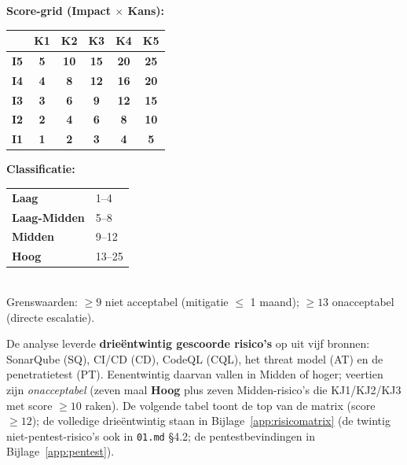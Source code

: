 \documentclass[12pt, a4paper]{report}
\newcommand{\rood}[1]{\textcolor{avansRed}{\textbf{#1}}}
\newcommand{\amber}[1]{\textcolor{ragAmber}{\textbf{#1}}}
\newcommand{\geel}[1]{\textcolor{ragYellow}{\textbf{#1}}}
\newcommand{\groen}[1]{\textcolor{ragGreen}{\textbf{#1}}}
\begin{document}
\begin{minipage}[t]{0.56\textwidth}
\small
\textbf{Score-grid (Impact $\times$ Kans):}\\[0.4em]
\begin{tabular}{@{}c|ccccc@{}}
 & \textbf{K1} & \textbf{K2} & \textbf{K3} & \textbf{K4} & \textbf{K5} \\
\midrule
\textbf{I5} & \geel{5}  & \amber{10} & \rood{15} & \rood{20} & \rood{25} \\
\textbf{I4} & \groen{4} & \geel{8}   & \amber{12}& \rood{16} & \rood{20} \\
\textbf{I3} & \groen{3} & \geel{6}   & \amber{9} & \amber{12}& \rood{15} \\
\textbf{I2} & \groen{2} & \groen{4}  & \geel{6}  & \geel{8}  & \amber{10}\\
\textbf{I1} & \groen{1} & \groen{2}  & \groen{3} & \groen{4} & \geel{5}  \\
\end{tabular}
\end{minipage}%
\hfill
\begin{minipage}[t]{0.40\textwidth}
\small
\textbf{Classificatie:}\\[0.4em]
\begin{tabular}{@{}ll@{}}
\groen{Laag}        & 1--4 \\
\geel{Laag-Midden}  & 5--8 \\
\amber{Midden}      & 9--12 \\
\rood{Hoog}         & 13--25 \\
\end{tabular}\\[0.6em]
Grenswaarden: $\geq 9$ niet acceptabel
(mitigatie $\leq$ 1 maand); $\geq 13$ onacceptabel
(directe escalatie).
\end{minipage}

\vspace{1em}
De analyse leverde \textbf{drieëntwintig gescoorde risico's} op uit vijf bronnen:
SonarQube (SQ), CI/CD (CD), CodeQL (CQL), het threat model (AT) en de
penetratietest (PT). Eenentwintig daarvan vallen in Midden of hoger; veertien zijn
\emph{onacceptabel} (zeven maal \rood{Hoog} plus zeven Midden-risico's die
KJ1/KJ2/KJ3 met score $\geq 10$ raken). De volgende tabel toont de top van de
matrix (score $\geq 12$); de volledige drieëntwintig staan in
Bijlage~\ref{app:risicomatrix} (de twintig niet-pentest-risico's ook in
\texttt{01.md} \S4.2; de pentestbevindingen in Bijlage~\ref{app:pentest}).
\end{document}
